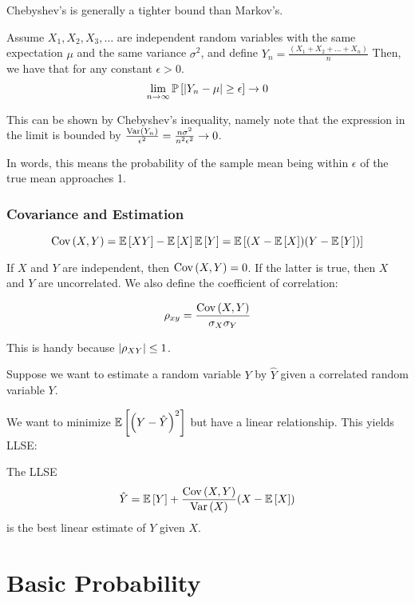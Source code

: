 Chebyshev's is generally a tighter bound than Markov's.

\begin{theorem}
    Assume $X_1, X_2, X_3, \dots$ are independent random variables with the same expectation
    $\mu$ and the same variance $\sigma^2$, and define $Y_n = \frac{(X_1 + X_2 + \dots + X_n)}{n}$
    Then, we have that for any constant $\epsilon > 0$.
    \[ \lim_{n \to \infty} \mathbb{P}\left[ \abs{Y_n - \mu} \geq \epsilon \right] \to 0 \]
\end{theorem}

This can be shown by Chebyshev's inequality, namely note that the expression in the limit
is bounded by $\frac{\text{Var}\left( Y_n \right)}{\epsilon^2} = \frac{n\sigma^2}{n^2\epsilon^2} \to 0$.

In words, this means the probability of the sample mean being within $\epsilon$ of the true mean
approaches 1.

\subsubsection{Covariance and Estimation}
\begin{definition} [Covariance]
    \[ \text{Cov}\left( X, Y \right) = \mathbb{E}\left[ XY \right] - \mathbb{E}\left[ X \right]\mathbb{E}\left[ Y \right] = \mathbb{E}\left[ (X - \mathbb{E}\left[ X \right])(Y - \mathbb{E}\left[ Y \right]) \right] \]
\end{definition}

If $X$ and $Y$ are independent, then $\text{Cov}\left( X, Y \right) = 0$. If the latter is true,
then $X$ and $Y$ are uncorrelated. We also define the coefficient of correlation:

\[ \rho_{xy} = \frac{\text{Cov}\left( X, Y \right)}{\sigma_X \sigma_Y} \]

This is handy because $\abs{\rho_{XY}} \leq 1$.

Suppose we want to estimate a random variable $Y$ by $\hat{Y}$ given a correlated
random variable $Y$.

We want to minimize $\mathbb{E}\left[ \qty(Y - \hat{Y})^2 \right]$ but have a linear relationship.
This yields LLSE:

\begin{theorem} 
    The LLSE
    \[ \hat{Y} = \mathbb{E}\left[ Y \right] + \frac{\text{Cov}\left( X, Y \right)}{\text{Var}\left( X \right)}\qty(X - \mathbb{E}\left[ X \right]) \]
    is the best linear estimate of $Y$ given $X$.
\end{theorem}

\section{Basic Probability}

